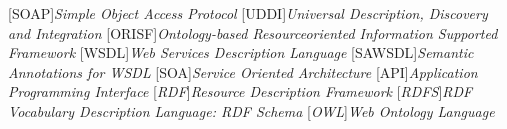 
[SOAP]{\emph{Simple Object Access Protocol}}
[UDDI]{\emph{Universal Description, Discovery and Integration}}
[ORISF]{\emph{Ontology-based Resourceoriented Information Supported Framework}}
[WSDL]{\emph{Web Services Description Language}}
[SAWSDL]{\emph{Semantic Annotations for WSDL}}
[SOA]{\emph{Service Oriented Architecture}}
[API]{\emph{Application Programming Interface}}
[\emph{RDF}]{\emph{Resource Description Framework}}
[\emph{RDFS}]{\emph{RDF Vocabulary Description Language: RDF Schema}}
[\emph{OWL}]{\emph{Web Ontology Language}}
